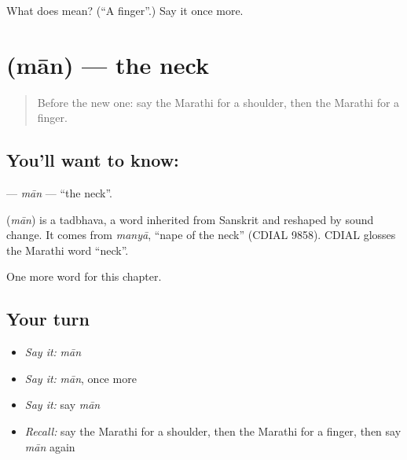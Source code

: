 \begin{tcolorbox}[breakable,colback=teal!4,colframe=teal!35!black,title={Before you move on}]
What does  mean? (\textquotedblleft{}A finger\textquotedblright{}.) Say it once more.
\end{tcolorbox}
\section[\texorpdfstring{\mr{मान} (mān)}{मान (mān)}]{ (mān) — the neck}

\label{lesson:MR-C71-man}



\begin{quote}
Before the new one: say the Marathi for a shoulder, then the Marathi for a finger.
\end{quote}

\subsection*{You'll want to know: }
\textbf{} — \emph{mān} — \textquotedblleft{}the neck\textquotedblright{}.

\begin{cousinweb}
\textbf{} (\emph{mān}) is a tadbhava, a word inherited from Sanskrit and reshaped by sound change. It comes from \emph{manyā}, \textquotedblleft{}nape of the neck\textquotedblright{} (CDIAL 9858). CDIAL glosses the Marathi word \textquotedblleft{}neck\textquotedblright{}.
\end{cousinweb}

\begin{grammarlens}[title={What you've built}]
One more word for this chapter.
\end{grammarlens}

\subsection*{Your turn}
\begin{itemize}
\raggedright
  \item \emph{Say it:} \emph{mān}
  \item \emph{Say it:} \emph{mān}, once more
  \item \emph{Say it:} say \emph{mān}
  \item \emph{Recall:} say the Marathi for a shoulder, then the Marathi for a finger, then say \emph{mān} again
\end{itemize}

